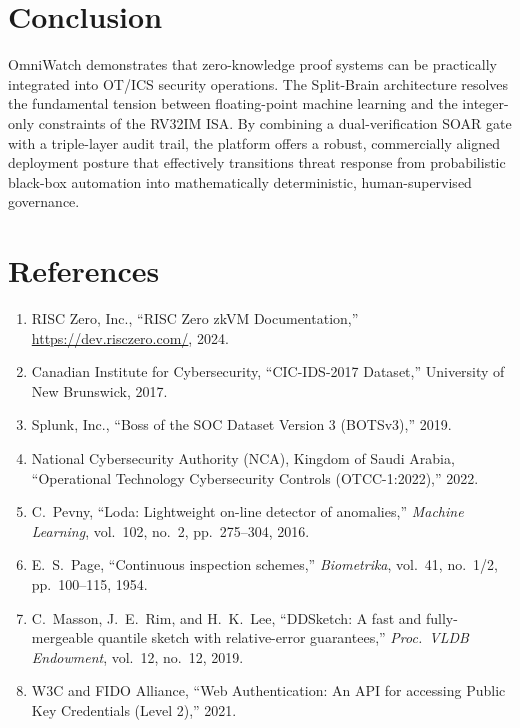 \documentclass[12pt,a4paper]{article}
\begin{document}
\section{Conclusion}

OmniWatch demonstrates that zero-knowledge proof systems can be
practically integrated into OT/ICS security operations. The Split-Brain
architecture resolves the fundamental tension between floating-point
machine learning and the integer-only constraints of the RV32IM ISA.
By combining a dual-verification SOAR gate with a triple-layer audit
trail, the platform offers a robust, commercially aligned deployment
posture that effectively transitions threat response from probabilistic
black-box automation into mathematically deterministic, human-supervised
governance.

\newpage
\section*{References}

\begin{enumerate}
  \item RISC Zero, Inc., ``RISC Zero zkVM Documentation,''
        \url{https://dev.risczero.com/}, 2024.
  \item Canadian Institute for Cybersecurity, ``CIC-IDS-2017 Dataset,''
        University of New Brunswick, 2017.
  \item Splunk, Inc., ``Boss of the SOC Dataset Version 3 (BOTSv3),'' 2019.
  \item National Cybersecurity Authority (NCA), Kingdom of Saudi Arabia,
        ``Operational Technology Cybersecurity Controls (OTCC-1:2022),'' 2022.
  \item C.~Pevny, ``Loda: Lightweight on-line detector of anomalies,''
        \textit{Machine Learning}, vol.~102, no.~2, pp.~275--304, 2016.
  \item E.~S.~Page, ``Continuous inspection schemes,''
        \textit{Biometrika}, vol.~41, no.~1/2, pp.~100--115, 1954.
  \item C.~Masson, J.~E.~Rim, and H.~K.~Lee, ``DDSketch: A fast and
        fully-mergeable quantile sketch with relative-error guarantees,''
        \textit{Proc.\ VLDB Endowment}, vol.~12, no.~12, 2019.
  \item W3C and FIDO Alliance, ``Web Authentication: An API for accessing
        Public Key Credentials (Level 2),'' 2021.
\end{enumerate}
\end{document}
